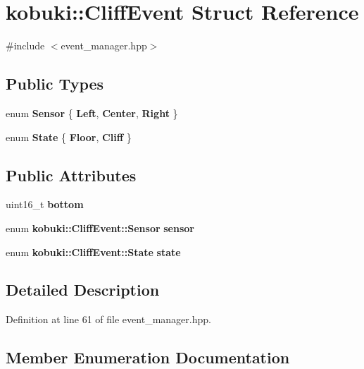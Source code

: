 \section{kobuki\-:\-:\-Cliff\-Event \-Struct \-Reference}
\label{structkobuki_1_1CliffEvent}


{\ttfamily \#include $<$event\-\_\-manager.\-hpp$>$}

\subsection*{\-Public \-Types}
\begin{DoxyCompactItemize}
\item 
enum {\bf \-Sensor} \{ {\bf \-Left}, 
{\bf \-Center}, 
{\bf \-Right}
 \}
\item 
enum {\bf \-State} \{ {\bf \-Floor}, 
{\bf \-Cliff}
 \}
\end{DoxyCompactItemize}
\subsection*{\-Public \-Attributes}
\begin{DoxyCompactItemize}
\item 
uint16\-\_\-t {\bf bottom}
\item 
enum {\bf kobuki\-::\-Cliff\-Event\-::\-Sensor} {\bf sensor}
\item 
enum {\bf kobuki\-::\-Cliff\-Event\-::\-State} {\bf state}
\end{DoxyCompactItemize}


\subsection{\-Detailed \-Description}


\-Definition at line 61 of file event\-\_\-manager.\-hpp.



\subsection{\-Member \-Enumeration \-Documentation}

